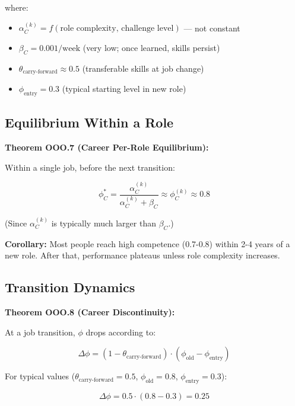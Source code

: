 where:
\begin{itemize}[nosep]
\item $\alpha_C^{(k)} = f(\text{role complexity, challenge level})$ --- not constant
\item $\beta_C = 0.001 / \text{week}$ (very low; once learned, skills persist)
\item $\theta_{\text{carry-forward}} \approx 0.5$ (transferable skills at job change)
\item $\phi_{\text{entry}} = 0.3$ (typical starting level in new role)
\end{itemize}

\subsection{Equilibrium Within a Role}

\textbf{Theorem OOO.7 (Career Per-Role Equilibrium):}

Within a single job, before the next transition:

\begin{equation}
\phi^*_C = \frac{\alpha_C^{(k)}}{\alpha_C^{(k)} + \beta_C} \approx \phi_C^{(k)} \approx 0.8
\end{equation}

(Since $\alpha_C^{(k)}$ is typically much larger than $\beta_C$.)

\textbf{Corollary:} Most people reach high competence (0.7-0.8) within 2-4 years of a new role. After that, performance plateaus unless role complexity increases.

\subsection{Transition Dynamics}

\textbf{Theorem OOO.8 (Career Discontinuity):}

At a job transition, $\phi$ drops according to:

\begin{equation}
\Delta \phi = (1 - \theta_{\text{carry-forward}}) \cdot (\phi_{\text{old}} - \phi_{\text{entry}})
\end{equation}

For typical values ($\theta_{\text{carry-forward}} = 0.5$, $\phi_{\text{old}} = 0.8$, $\phi_{\text{entry}} = 0.3$):

\begin{equation}
\Delta \phi = 0.5 \cdot (0.8 - 0.3) = 0.25
\end{equation}

